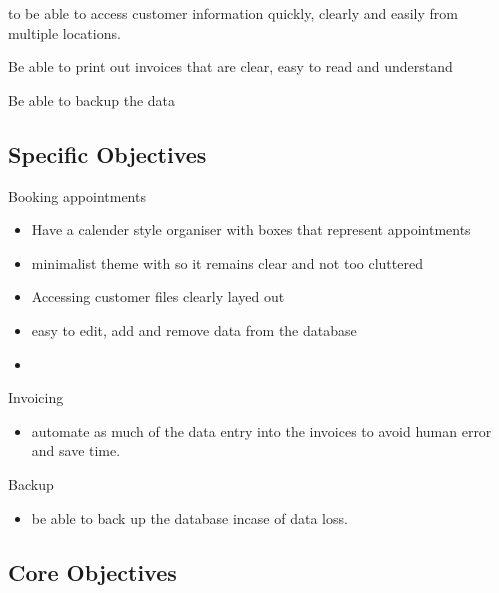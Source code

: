 		to be able to access customer information quickly, clearly and easily from multiple locations.
		
		Be able to print out invoices that are clear, easy to read and understand
		
		Be able to backup the data
		
		
		

	\subsection{Specific Objectives}
	
	Booking appointments
	
	\begin{itemize}
	
	\item Have a calender style organiser with boxes that represent appointments
	
	\item minimalist theme with so it remains clear and not too cluttered 	
	
	\item Accessing customer files clearly layed out
	
	\item easy to edit, add and remove data from the database
	
	\end{itemize}
	
	\begin{itemize}
	
	\item 
	
	\end{itemize}
	
	Invoicing
	
	\begin{itemize}
	\item automate as much of the data entry into the invoices to avoid human error and save time.
	
	\end{itemize}
	
	Backup 
	
	\begin{itemize}
	
	\item be able to back up the database incase of data loss.
	
	\end{itemize}
	

	

	\subsection{Core Objectives}
	
